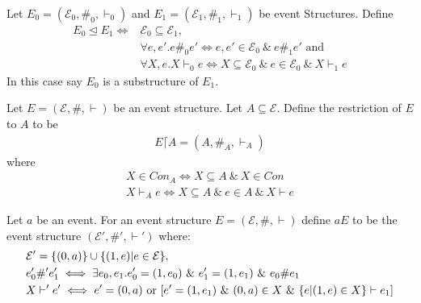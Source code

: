 \begin{definition}
    Let $E_0 = (\mathcal{E}_0,\#_0,\vdash_0)$ and $E_1 = (\mathcal{E}_1,\#_1,\vdash_1)$
    be event Structures. Define
    \begin{align*}
        E_0 \trianglelefteq E_1 \iff & \mathcal{E}_0 \subseteq \mathcal{E}_1,                                          \\
                                     & \forall e,e'. e\#_0e'  \iff e,e' \in \mathcal{E}_0 \ \& \ e\#_1 e' \text{ and } \\
                                     & \forall X,e.X\vdash_0 e  \iff X \subseteq \mathcal{E}_0
        \ \& \ e \in \mathcal{E}_0\ \& \ X \vdash_1 e
    \end{align*}
    In this case say $E_0$ is a substructure of $E_1$.
\end{definition}

\begin{definition}[Restriction]
    Let $E = (\mathcal{E},\#,\vdash)$ be an event structure.
    Let $A \subseteq \mathcal{E}$.
    Define the restriction of $E$ to $A$ to be
    \begin{align*}
        E \lceil A = (A,\#_A,\vdash_A)
    \end{align*}
    where
    \begin{align*}
        X \in Con_A \iff X \subseteq A \ \& \ X \in Con \\
        X \vdash_A e \iff X \subseteq A \ \& \ e \in A \ \& \ X \vdash e
    \end{align*}
\end{definition}

\begin{definition}
    Let $a$ be an event.
    For an event structure $E = (\mathcal{E},\#,\vdash)$ define $aE$ to be the event structure $(\mathcal{E'},\#',\vdash')$ where:
    \begin{align*}
         & \mathcal{E'} = \s{(0,a)} \cup \s{(1,e)|e \in \mathcal{E}},                                                   \\
         & e_0' \#' e_1'  \iff \exists e_0,e_1.e_0' = (1,e_0)
        \ \& \ e_1' = (1,e_1) \ \& \ e_0 \# e_1                                                                         \\
         & X \vdash' e' \iff e' = (0,a) \text{ or } [e' = (1,e_1) \ \& \ (0,a)\in X \ \& \ \s{e|(1,e)\in X} \vdash e_1]
    \end{align*}
\end{definition}

